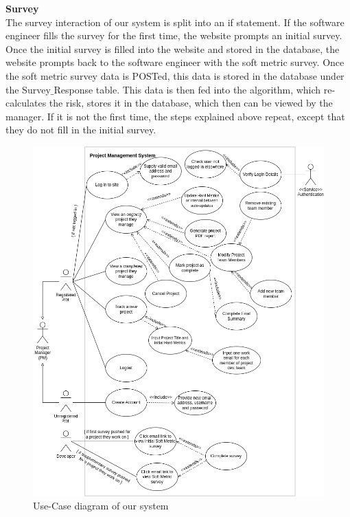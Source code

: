 \documentclass[a4paper]{article}
\theoremstyle{plain}
\theoremstyle{definition}
\theoremstyle{remark}
\begin{document}
\noindent \textbf{Survey}\\
The survey interaction of our system is split into an if statement. If the software engineer fills the survey for the first time, the website prompts an initial survey. Once the initial survey is filled into the website and stored in the database, the website prompts back to the software engineer with the soft metric survey. Once the soft metric survey data is POSTed, this data is stored in the database under the Survey$\_$Response table. This data is then fed into the algorithm, which re-calculates the risk, stores it in the database, which then can be viewed by the manager. If it is not the first time, the steps explained above repeat, except that they do not fill in the initial survey.
\begin{figure}[H]
    \centering
    \begin{minipage}{0.5\textwidth}
        \centering
        \includegraphics[width=1\textwidth]{usecase.png} %
        \caption{Use-Case diagram of our system}
	\label{fig:usecase}
    \end{minipage}\hfill
    \begin{minipage}{0.5\textwidth}

\end{minipage}
\end{figure}
\end{document}
